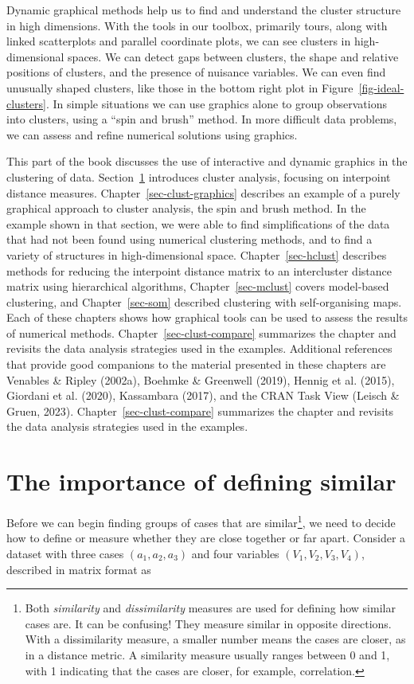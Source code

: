 \documentclass[
  letterpaper,
]{krantz}
\begin{document}
Dynamic graphical methods help us to find and understand the cluster
structure in high dimensions. With the tools in our toolbox, primarily
tours, along with linked scatterplots and parallel coordinate plots, we
can see clusters in high-dimensional spaces. We can detect gaps between
clusters, the shape and relative positions of clusters, and the presence
of nuisance variables. We can even find unusually shaped clusters, like
those in the bottom right plot in Figure~\ref{fig-ideal-clusters}. In
simple situations we can use graphics alone to group observations into
clusters, using a ``spin and brush'' method. In more difficult data
problems, we can assess and refine numerical solutions using
graphics.

This part of the book discusses the use of interactive and dynamic
graphics in the clustering of data. Section~\ref{sec-clust-bg}
introduces cluster analysis, focusing on interpoint distance measures.
Chapter~\ref{sec-clust-graphics} describes an example of a purely
graphical approach to cluster analysis, the spin and brush method. In
the example shown in that section, we were able to find simplifications
of the data that had not been found using numerical clustering methods,
and to find a variety of structures in high-dimensional space.
Chapter~\ref{sec-hclust} describes methods for reducing the interpoint
distance matrix to an intercluster distance matrix using hierarchical
algorithms, Chapter~\ref{sec-mclust} covers model-based clustering, and
Chapter~\ref{sec-som} described clustering with self-organising maps.
Each of these chapters shows how graphical tools can be used to assess
the results of numerical methods. Chapter~\ref{sec-clust-compare}
summarizes the chapter and revisits the data analysis strategies used in
the examples. Additional references that provide good companions to the
material presented in these chapters are Venables \& Ripley (2002a),
Boehmke \& Greenwell (2019), Hennig et al. (2015), Giordani et al.
(2020), Kassambara (2017), and the CRAN Task View (Leisch \& Gruen,
2023). Chapter~\ref{sec-clust-compare} summarizes the chapter and
revisits the data analysis strategies used in the examples.

\section{The importance of defining similar}\label{sec-clust-bg}

Before we can begin finding groups of cases that are similar\footnote{Both
  \emph{similarity} and \emph{dissimilarity} measures are used for
  defining how similar cases are. It can be confusing! They measure
  similar in opposite directions. With a dissimilarity measure, a
  smaller number means the cases are closer, as in a distance metric. A
  similarity measure usually ranges between 0 and 1, with 1 indicating
  that the cases are closer, for example, correlation.}, we need to
decide how to define or measure whether they are close together or far
apart. Consider a dataset with three cases \((a_1, a_2, a_3)\) and four
variables \((V_1, V_2, V_3, V_4)\), described in matrix format as
\end{document}
